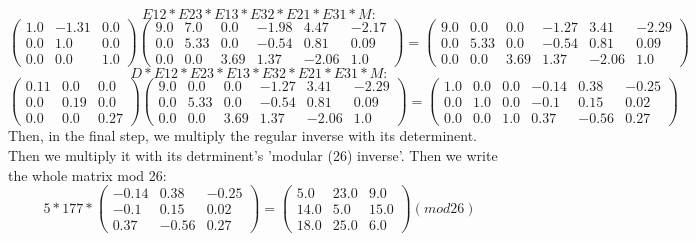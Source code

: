 \documentclass{article}%
\begin{document}
\newline%
%
\[%
E12 * E23 * E13 * E32 * E21 * E31 * M:%
\]%
\[%
\begin{pmatrix}%
1.0&-1.31&0.0\\%
0.0&1.0&0.0\\%
0.0&0.0&1.0%
\end{pmatrix} \begin{pmatrix}%
9.0&7.0&0.0&-1.98&4.47&-2.17\\%
0.0&5.33&0.0&-0.54&0.81&0.09\\%
0.0&0.0&3.69&1.37&-2.06&1.0%
\end{pmatrix} = \begin{pmatrix}%
9.0&0.0&0.0&-1.27&3.41&-2.29\\%
0.0&5.33&0.0&-0.54&0.81&0.09\\%
0.0&0.0&3.69&1.37&-2.06&1.0%
\end{pmatrix}%
\]%
\newline%
%
\[%
D * E12 * E23 * E13 * E32 * E21 * E31 * M:%
\]%
\[%
\begin{pmatrix}%
0.11&0.0&0.0\\%
0.0&0.19&0.0\\%
0.0&0.0&0.27%
\end{pmatrix} \begin{pmatrix}%
9.0&0.0&0.0&-1.27&3.41&-2.29\\%
0.0&5.33&0.0&-0.54&0.81&0.09\\%
0.0&0.0&3.69&1.37&-2.06&1.0%
\end{pmatrix} = \begin{pmatrix}%
1.0&0.0&0.0&-0.14&0.38&-0.25\\%
0.0&1.0&0.0&-0.1&0.15&0.02\\%
0.0&0.0&1.0&0.37&-0.56&0.27%
\end{pmatrix}%
\]%
\newline%
%
Then, in the final step, we multiply the regular inverse with its determinent. Then we multiply it with its detrminent's 'modular (26) inverse'. Then we write the whole matrix mod 26:%
\[%
5 * 177 *  \begin{pmatrix}%
-0.14&0.38&-0.25\\%
-0.1&0.15&0.02\\%
0.37&-0.56&0.27%
\end{pmatrix} = \begin{pmatrix}%
5.0&23.0&9.0\\%
14.0&5.0&15.0\\%
18.0&25.0&6.0%
\end{pmatrix} (mod  26)%
\]%
\newline%
\end{document}
